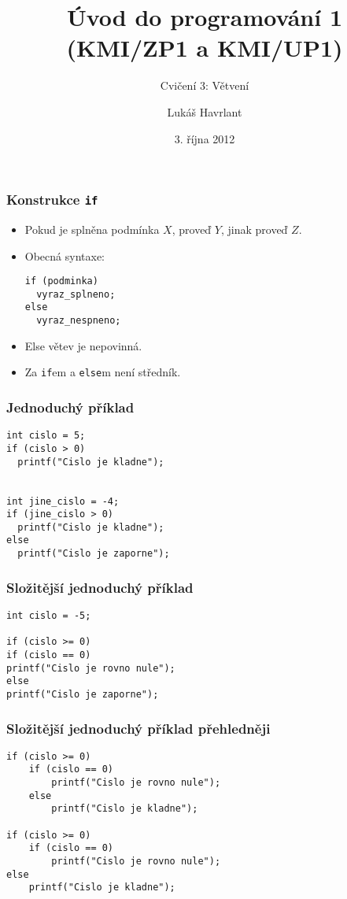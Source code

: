 \documentclass{beamer}
\title{Úvod do programování 1 (KMI/ZP1 a KMI/UP1)}
\subtitle{Cvičení 3: Větvení}
\author{Lukáš Havrlant}
\date{3. října 2012}
\institute{Univerzita Palackého}
\newenvironment{itemizex}%
  {\large \begin{itemize}%
    \setlength{\itemsep}{8pt}%
    \setlength{\parskip}{8pt}}%
  {\end{itemize}}
\begin{document}
\begin{frame}[t,plain]
\titlepage
\end{frame}



\begin{frame}[t,fragile]\frametitle{Konstrukce \texttt{if}} 
  \begin{itemizex}
    \item Pokud je splněna podmínka $X$, proveď $Y$, jinak proveď $Z$.
    \item Obecná syntaxe: 
    \begin{verbatim} 
if (podminka)
  vyraz_splneno;
else 
  vyraz_nespneno;
    \end{verbatim}
    \item Else větev je nepovinná.
    \item Za \texttt{if}em a \texttt{else}m není středník.
  \end{itemizex}
\end{frame}


\begin{frame}[t,fragile]\frametitle{Jednoduchý příklad} 
  \begin{verbatim} 
int cislo = 5;
if (cislo > 0)
  printf("Cislo je kladne");


int jine_cislo = -4;
if (jine_cislo > 0)
  printf("Cislo je kladne");
else
  printf("Cislo je zaporne");
  \end{verbatim}
\end{frame}



\begin{frame}[t,fragile]\frametitle{Složitější jednoduchý příklad} 
  \begin{verbatim} 
int cislo = -5;

if (cislo >= 0)
if (cislo == 0)
printf("Cislo je rovno nule");
else
printf("Cislo je zaporne");
  \end{verbatim}
\end{frame}


\begin{frame}[t,fragile]\frametitle{Složitější jednoduchý příklad přehledněji} 
\begin{verbatim} 
if (cislo >= 0)
    if (cislo == 0)
        printf("Cislo je rovno nule");
    else
        printf("Cislo je kladne");

if (cislo >= 0)
    if (cislo == 0)
        printf("Cislo je rovno nule");
else
    printf("Cislo je kladne");
\end{verbatim}
\end{frame}
\end{document}
